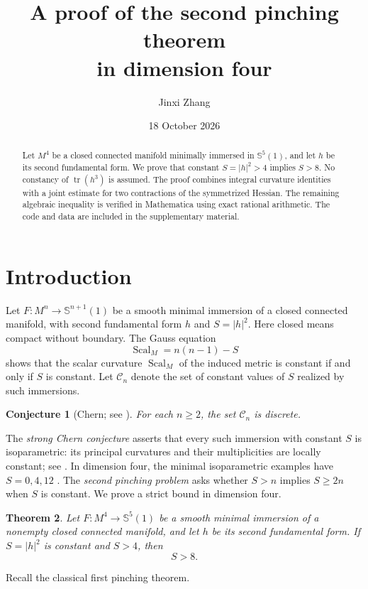 \documentclass[11pt,a4paper]{amsart}
\title[The second pinching problem in dimension four]{A proof of the second pinching theorem\\
in dimension four}
\author{Jinxi Zhang}
\date{18 October 2026}
\numberwithin{equation}{section}
\newtheorem{theorem}{Theorem}[section]
\newtheorem{conjecture}[theorem]{Conjecture}
\theoremstyle{definition}
\theoremstyle{remark}
\DeclareMathOperator{\tr}{tr}
\DeclareMathOperator{\Scal}{Scal}
\newcommand{\Sph}{\mathbb S}
\begin{document}
\begin{abstract}
Let $M^4$ be a closed connected manifold minimally immersed in
$\Sph^5(1)$, and let $h$ be its second fundamental form. We prove
that constant $S=|h|^2>4$ implies $S>8$. No constancy of
$\tr(h^3)$ is assumed. The proof combines integral curvature identities
with a joint estimate for two contractions of the symmetrized Hessian.
The remaining algebraic inequality is verified in Mathematica using
exact rational arithmetic. The code and data are included in the
supplementary material.
\end{abstract}
\maketitle

\section{Introduction}
Let $F:M^n\to\Sph^{n+1}(1)$ be a smooth minimal immersion of a closed
connected manifold, with second fundamental form $h$ and $S=|h|^2$.
Here closed means compact without boundary. The Gauss equation
\[
 \Scal_M=n(n-1)-S
\]
shows that the scalar curvature $\Scal_M$ of the induced metric
is constant if and only if $S$ is constant. Let
$\mathcal C_n$ denote the set of constant values of $S$ realized
by such immersions.

\begin{conjecture}[Chern; see \cite{CDK,HXZ}]
For each $n\ge2$, the set $\mathcal C_n$ is discrete.
\end{conjecture}

The \emph{strong Chern conjecture} asserts that every such immersion
with constant $S$ is isoparametric: its principal curvatures and their
multiplicities are locally constant; see \cite[Conjecture~1.4]{HXZ}.
In dimension four, the minimal isoparametric examples have $S=0,4,12$
\cite{Cartan,Munzner1,Munzner2}.
The \emph{second pinching problem} asks whether $S>n$ implies
$S\ge2n$ when $S$ is constant. We prove a strict bound in dimension four.

\begin{theorem}\label{thm:main}
Let $F:M^4\to\Sph^5(1)$ be a smooth minimal immersion of a nonempty
closed connected manifold, and let $h$ be its second fundamental form.
If $S=|h|^2$ is constant and $S>4$, then
\[
 S>8.
\]
\end{theorem}

Recall the classical first pinching theorem.
\end{document}
